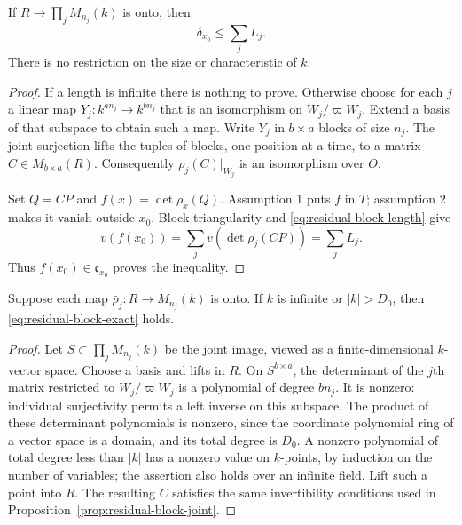 \begin{proposition}
\label{prop:residual-block-joint}
If $R\to\prod_jM_{n_j}(k)$ is onto, then
\begin{equation}\label{eq:residual-block-exact}
                       \delta_{x_0}\le\sum_jL_j.
\end{equation}
There is no restriction on the size or characteristic of $k$.
\end{proposition}
\begin{proof}
If a length is infinite there is nothing to prove. Otherwise choose
for each $j$ a linear map
$Y_j:k^{an_j}\to k^{bn_j}$ that is an isomorphism on
$W_j/\varpi W_j$. Extend a basis of that subspace to obtain such
a map. Write $Y_j$ in $b\times a$ blocks of size $n_j$.
The joint surjection lifts the tuples of blocks, one position at a
time, to a matrix $C\in M_{b\times a}(R)$.
Consequently $\rho_j(C)|_{W_j}$ is an isomorphism over $O$.

Set $Q=CP$ and $f(x)=\det\rho_x(Q)$. Assumption 1 puts $f$ in $T$;
assumption 2 makes it vanish outside $x_0$. Block triangularity and
\eqref{eq:residual-block-length} give
\[
 v(f(x_0))=\sum_jv(\det\rho_j(CP))=\sum_jL_j.
\]
Thus $f(x_0)\in\mathfrak c_{x_0}$ proves the inequality.
\end{proof}

\begin{proposition}
\label{prop:residual-block-large-field}
Suppose each map $\bar\rho_j:R\to M_{n_j}(k)$ is onto.
If $k$ is infinite or $|k|>D_0$, then
\eqref{eq:residual-block-exact} holds.
\end{proposition}
\begin{proof}
Let $S\subset\prod_jM_{n_j}(k)$ be the joint image, viewed as a
finite-dimensional $k$-vector space. Choose a basis and lifts in $R$.
On $S^{b\times a}$, the determinant of the $j$th matrix restricted
to $W_j/\varpi W_j$ is a polynomial of degree $bn_j$.
It is nonzero: individual surjectivity permits a left inverse
on this subspace. The product of these determinant polynomials
is nonzero, since the coordinate polynomial ring of a vector
space is a domain, and its total degree is $D_0$.
A nonzero polynomial of total degree less than $|k|$ has a
nonzero value on $k$-points, by induction on the number of variables;
the assertion also holds over an infinite field.
Lift such a point into $R$. The resulting $C$ satisfies the
same invertibility conditions used in
Proposition~\ref{prop:residual-block-joint}.
\end{proof}

